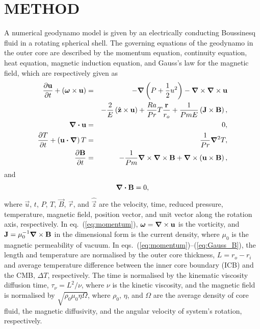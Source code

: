 \section{METHOD}

A numerical geodynamo model is given by an electrically conducting Boussinesq fluid in a rotating spherical shell. The governing equations of the geodynamo in the outer core are described by the momentum equation, continuity equation, heat equation, magnetic induction equation, and Gauss's law for the magnetic field, which are respectively given as
%
\begin{eqnarray}
\frac{\partial \vec{u}}{\partial t} + \left(\boldsymbol{\omega} \times \vec{u}\right)
 &=& - \bnabla \left(P+\frac{1}{2}u^{2} \right) - \bnabla \times \bnabla \times \vec{u}
\nonumber \\
 & &   - \frac{2}{E} \left(\hat{\vec{z}} \times \vec{u} \right)
  + \frac{Ra}{Pr} T \frac{\vec{r}}{r_{o}}
  + \frac{1}{Pm E} \left(\vec{J} \times \vec{B} \right),
\label{eq:momentum} \\
%
\bnabla \bcdot \vec{u} &=& 0, 
\label{eq:conservation} \\
%
\frac{\partial T}{\partial t} + \left(\vec{u} \bcdot \bnabla \right) T
 &=& \frac{1}{Pr} \bnabla^{2} T,
\label{eq:heat} \\
%
 \frac{\partial \vec{B}}{\partial t}
 &=& -\frac{1}{Pm}  \bnabla \times \bnabla \times \vec{B}
       + \bnabla \times \left(\vec{u} \times \vec{B} \right),
\label{eq:induction}
\end{eqnarray}
%
and
\begin{equation}
\boldsymbol{\nabla} \boldsymbol{\cdot} \mathbf{B} = 0,
\label{eq:Gauss_B}
\end{equation}
%
where $\vec{u}$, $t$, $P$, $T$, $\vec{B}$, $\vec{r}$, and $\hat{\vec{z}}$ are the velocity, time, reduced pressure, temperature, magnetic field, position vector, and unit vector along the rotation axis, respectively.
In eq.~(\ref{eq:momentum}), $\boldsymbol{\omega} = \boldsymbol{\nabla} \times \mathbf{u}$ is the vorticity, and $\mathbf{J} = \mu_{0}^{-1} \boldsymbol{\nabla} \times \mathbf{B}$ in the dimensional form is the current density, where $\mu_0$ is the magnetic permeability of vacuum.
In eqs.~(\ref{eq:momentum})--(\ref{eq:Gauss_B}), the length and temperature are normalised by the outer core thickness, $L = r_{o} - r_{i}$ and average temperature difference between the inner core boundary (ICB) and the CMB, $\Delta T$, respectively. 
The time is normalised by the kinematic viscosity diffusion time, $\tau_{\nu}  = L^{2} / \nu$, where $\nu$ is the kinetic viscosity, and the magnetic field is normalised by $\sqrt{\rho_{0} \mu_{0} \eta \Omega}$, where $\rho_{0}$, $\eta$, and $\Omega$ are the average density of core fluid, the magnetic diffusivity, and the angular velocity of system's rotation, respectively.
